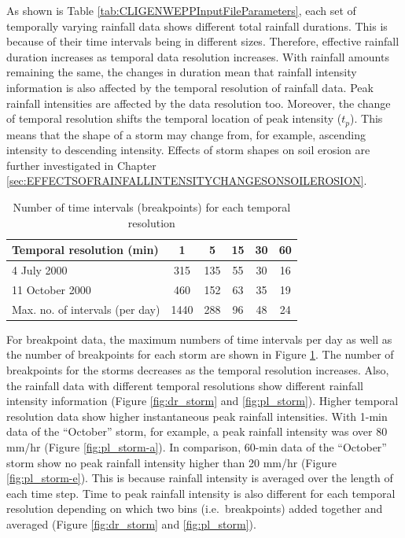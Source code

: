 As shown is Table \ref{tab:CLIGENWEPPInputFileParameters}, each set of
temporally varying rainfall data shows different total rainfall durations. This
is because of their time intervals being in different sizes. Therefore,
effective rainfall duration increases as temporal data resolution increases.
With
rainfall amounts remaining the same, the changes in duration mean that rainfall
intensity information is also affected by the temporal resolution of rainfall
data.
Peak rainfall intensities are affected by the data resolution too. Moreover, the
change of temporal resolution shifts the temporal location of peak intensity
($t_p$). This means that the shape of a storm may change from, for example,
ascending intensity to descending intensity. Effects of storm shapes on soil
erosion are further investigated in Chapter
\ref{sec:EFFECTSOFRAINFALLINTENSITYCHANGESONSOILEROSION}.

\begin{table}[htbp]
  \centering
  \small
  \caption{Number of time intervals (breakpoints) for each temporal resolution}
  \label{tab:maxnooftimeintervalsperday}
    \begin{tabular}{lccccc}
    \toprule
    Temporal resolution (min) & 1 & 5 & 15 & 30 & 60 \\ \midrule
    4 July 2000 & 315 & 135 & 55 & 30 & 16 \\
    11 October 2000 & 460 & 152 & 63 & 35 & 19 \\
    Max. no. of intervals (per day) & 1440 & 288 & 96 & 48 & 24 \\
    \bottomrule
    \end{tabular}
\end{table}

For breakpoint data, the maximum numbers of time intervals per day as well as
the number of breakpoints for each storm are shown in Figure
\ref{tab:maxnooftimeintervalsperday}. The number of breakpoints for the storms
decreases as the temporal resolution increases. Also, the rainfall data with
different temporal resolutions show different rainfall intensity information
(Figure
\ref{fig:dr_storm} and \ref{fig:pl_storm}). Higher temporal resolution data show
higher instantaneous peak rainfall intensities. With 1-min data of the
``October'' storm, for example, a peak rainfall intensity was over 80 mm/hr
(Figure \ref{fig:pl_storm-a}). In comparison, 60-min data of the ``October''
storm show no peak rainfall intensity higher than 20 mm/hr (Figure
\ref{fig:pl_storm-e}). This is because rainfall intensity is averaged over the
length of each time step. Time to peak rainfall intensity is also different for
each temporal resolution depending on which two bins (i.e.\ breakpoints) added
together and averaged (Figure \ref{fig:dr_storm} and \ref{fig:pl_storm}).

